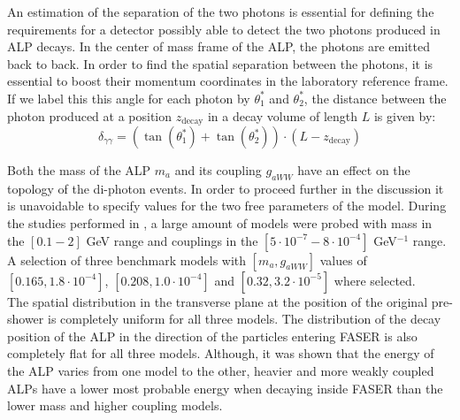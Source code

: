 		An estimation of the separation of the two photons is essential for defining the requirements for a detector possibly able to detect the two photons produced in ALP decays. In the center of mass frame of the ALP, the photons are emitted back to back. In order to find the spatial separation between the photons, it is essential to boost their momentum coordinates in the laboratory reference frame. If we label this this angle for each photon by $\theta^*_1$ and $\theta^*_2$, the distance between the photon produced at a position $z_{\text{decay}}$ in a decay volume of length $L$ is given by: 
		\begin{equation}
			\delta_{\gamma\gamma} = {\left( \tan(\theta^*_1) + \tan(\theta^*_2)\right)} \cdot (L-z_{\text{decay}})
		\end{equation}
		
		Both the mass of the ALP $m_a$ and its coupling $g_{aWW}$ have an effect on the topology of the di-photon events. In order to proceed further in the discussion it is unavoidable to specify values for the two free parameters of the model. During the studies performed in \cite{Moretti_MasterThesis}, a large amount of models were probed with mass in the $[0.1-2]$ GeV range and couplings in the $[5\cdot 10^{-7} - 8 \cdot 10^{-4}]$ GeV$^{-1}$ range. A selection of three benchmark models with $\left[m_a, g_{aWW}\right]$ values of $\left[0.165, 1.8\cdot 10^{-4}\right]$, $\left[0.208, 1.0\cdot 10^{-4}\right]$ and $\left[0.32, 3.2\cdot 10^{-5}\right]$ where selected. \\
		
		The spatial distribution in the transverse plane at the position of the original pre-shower is completely uniform for all three models. The distribution of the decay position of the ALP in the direction of the particles entering FASER is also completely flat for all three models. Although, it was shown that the energy of the ALP varies from one model to the other, heavier and more weakly coupled ALPs have a lower most probable energy when decaying inside FASER than the lower mass and higher coupling models. \\
		
